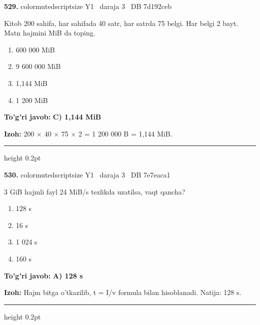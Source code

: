 \documentclass[10pt,a4paper,oneside]{article}
\begin{document}
\noindent\textbf{\color{ink}529.}  {color{muted}scriptsize Y1 \textbullet\ daraja 3 \textbullet\ DB 7d192ceb}
\par
Kitob 200 sahifa, har sahifada 40 satr, har satrda 75 belgi. Har belgi 2 bayt. Matn hajmini MiB da toping.
\begin{enumerate}[label=\Alph*),leftmargin=9mm]
\item 600 000 MiB
\item 9 600 000 MiB
\item 1,144 MiB
\item 1 200 MiB
\end{enumerate}
\begin{tcolorbox}[enhanced,breakable,colback=teal!4,colframe=teal!50!black,boxrule=0.5pt,arc=1.1mm,left=3mm,right=3mm,top=1.7mm,bottom=1.7mm,before skip=2mm,after skip=2mm]
\textbf{\color{teal}To'g'ri javob:} \textbf{C) 1,144 MiB}
\par\smallskip
\textbf{Izoh:} 200 \ensuremath{\times} 40 \ensuremath{\times} 75 \ensuremath{\times} 2 = 1 200 000 B = 1,144 MiB.
\end{tcolorbox}
\vspace{2mm}\hrule height 0.2pt \vspace{3mm}

\noindent\textbf{\color{ink}530.}  {color{muted}scriptsize Y1 \textbullet\ daraja 3 \textbullet\ DB 7e7eaca1}
\par
3 GiB hajmli fayl 24 MiB/s tezlikda uzatilsa, vaqt qancha?
\begin{enumerate}[label=\Alph*),leftmargin=9mm]
\item 128 s
\item 16 s
\item 1 024 s
\item 160 s
\end{enumerate}
\begin{tcolorbox}[enhanced,breakable,colback=teal!4,colframe=teal!50!black,boxrule=0.5pt,arc=1.1mm,left=3mm,right=3mm,top=1.7mm,bottom=1.7mm,before skip=2mm,after skip=2mm]
\textbf{\color{teal}To'g'ri javob:} \textbf{A) 128 s}
\par\smallskip
\textbf{Izoh:} Hajm bitga o'tkazilib, t = I/v formula bilan hisoblanadi. Natija: 128 s.
\end{tcolorbox}
\vspace{2mm}\hrule height 0.2pt \vspace{3mm}
\end{document}
